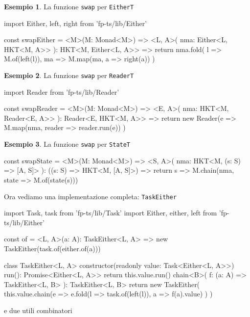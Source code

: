\documentclass[12pt]{article}
\theoremstyle{definition}
\newtheorem{example}{Esempio}[section]
\newenvironment{code}
  {\vspace{0.5cm} \VerbatimEnvironment\begin{typescriptcode}}
  {\end{typescriptcode} \vspace{0.2cm}}
\begin{document}
\begin{example}
La funzione \texttt{swap} per \texttt{EitherT}

\begin{code}
import { Either, left, right } from 'fp-ts/lib/Either'

const swapEither = <M>(M: Monad<M>) => <L, A>(
  nma: Either<L, HKT<M, A>>
): HKT<M, Either<L, A>> => {
  return nma.fold(
    l => M.of(left(l)),
    ma => M.map(ma, a => right(a))
  )
}
\end{code}
\end{example}

\begin{example}
La funzione \texttt{swap} per \texttt{ReaderT}

\begin{code}
import { Reader } from 'fp-ts/lib/Reader'

const swapReader = <M>(M: Monad<M>) => <E, A>(
  nma: HKT<M, Reader<E, A>>
): Reader<E, HKT<M, A>> => {
  return new Reader(e =>
    M.map(nma, reader => reader.run(e))
  )
}
\end{code}
\end{example}

\begin{example}
La funzione \texttt{swap} per \texttt{StateT}

\begin{code}
const swapState = <M>(M: Monad<M>) => <S, A>(
  nma: HKT<M, (s: S) => [A, S]>
): ((s: S) => HKT<M, [A, S]>) => {
  return s => M.chain(nma, state => M.of(state(s)))
}
\end{code}
\end{example}

Ora vediamo una implementazione completa: \texttt{TaskEither}

\begin{code}
import { Task, task } from 'fp-ts/lib/Task'
import { Either, either, left } from 'fp-ts/lib/Either'

const of = <L, A>(a: A): TaskEither<L, A> =>
  new TaskEither(task.of(either.of(a)))

class TaskEither<L, A> {
  constructor(readonly value: Task<Either<L, A>>) {}
  run(): Promise<Either<L, A>> {
    return this.value.run()
  }
  chain<B>(
    f: (a: A) => TaskEither<L, B>
  ): TaskEither<L, B> {
    return new TaskEither(
      this.value.chain(e =>
        e.fold(l => task.of(left(l)), a => f(a).value)
      )
    )
  }
}
\end{code}

e due utili combinatori
\end{document}
